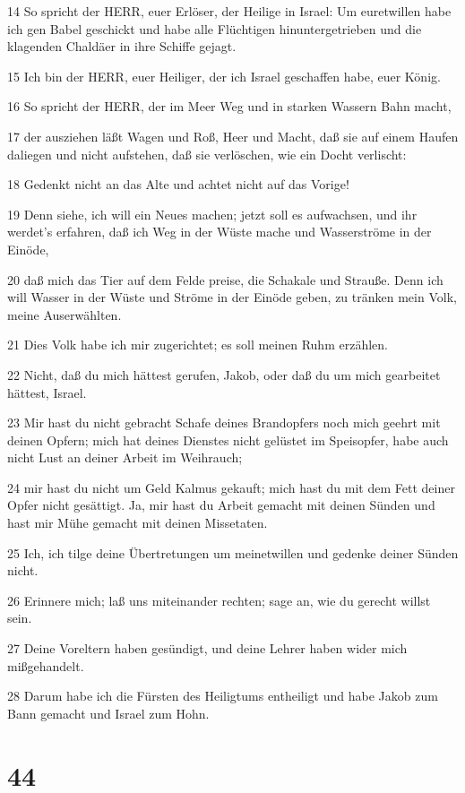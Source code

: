 \par 14 So spricht der HERR, euer Erlöser, der Heilige in Israel: Um euretwillen habe ich gen Babel geschickt und habe alle Flüchtigen hinuntergetrieben und die klagenden Chaldäer in ihre Schiffe gejagt.
\par 15 Ich bin der HERR, euer Heiliger, der ich Israel geschaffen habe, euer König.
\par 16 So spricht der HERR, der im Meer Weg und in starken Wassern Bahn macht,
\par 17 der ausziehen läßt Wagen und Roß, Heer und Macht, daß sie auf einem Haufen daliegen und nicht aufstehen, daß sie verlöschen, wie ein Docht verlischt:
\par 18 Gedenkt nicht an das Alte und achtet nicht auf das Vorige!
\par 19 Denn siehe, ich will ein Neues machen; jetzt soll es aufwachsen, und ihr werdet's erfahren, daß ich Weg in der Wüste mache und Wasserströme in der Einöde,
\par 20 daß mich das Tier auf dem Felde preise, die Schakale und Strauße. Denn ich will Wasser in der Wüste und Ströme in der Einöde geben, zu tränken mein Volk, meine Auserwählten.
\par 21 Dies Volk habe ich mir zugerichtet; es soll meinen Ruhm erzählen.
\par 22 Nicht, daß du mich hättest gerufen, Jakob, oder daß du um mich gearbeitet hättest, Israel.
\par 23 Mir hast du nicht gebracht Schafe deines Brandopfers noch mich geehrt mit deinen Opfern; mich hat deines Dienstes nicht gelüstet im Speisopfer, habe auch nicht Lust an deiner Arbeit im Weihrauch;
\par 24 mir hast du nicht um Geld Kalmus gekauft; mich hast du mit dem Fett deiner Opfer nicht gesättigt. Ja, mir hast du Arbeit gemacht mit deinen Sünden und hast mir Mühe gemacht mit deinen Missetaten.
\par 25 Ich, ich tilge deine Übertretungen um meinetwillen und gedenke deiner Sünden nicht.
\par 26 Erinnere mich; laß uns miteinander rechten; sage an, wie du gerecht willst sein.
\par 27 Deine Voreltern haben gesündigt, und deine Lehrer haben wider mich mißgehandelt.
\par 28 Darum habe ich die Fürsten des Heiligtums entheiligt und habe Jakob zum Bann gemacht und Israel zum Hohn.

\chapter{44}

